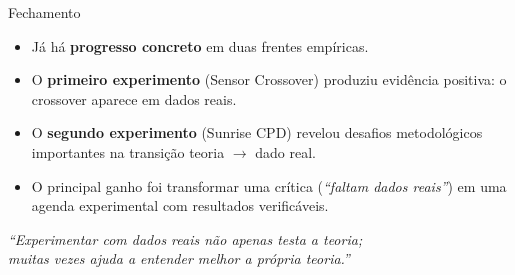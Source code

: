 \documentclass[aspectratio=169, 11pt]{beamer}
\begin{document}
\begin{frame}{Fechamento}

\begin{itemize}
  \item Já há \textbf{progresso concreto} em duas frentes empíricas.
  \item O \textbf{primeiro experimento} (Sensor Crossover) produziu
        evidência positiva: o crossover aparece em dados reais.
  \item O \textbf{segundo experimento} (Sunrise CPD) revelou desafios
        metodológicos importantes na transição teoria $\to$ dado real.
  \item O principal ganho foi transformar uma crítica
        (\textit{``faltam dados reais''}) em uma agenda experimental
        com resultados verificáveis.
\end{itemize}

\vspace{1.0em}
\begin{center}
\begin{minipage}{0.88\textwidth}
\centering\itshape
\textcolor{accent}{\large
``Experimentar com dados reais não apenas testa a teoria;\\
muitas vezes ajuda a entender melhor a própria teoria.''}
\end{minipage}
\end{center}

\end{frame}
\end{document}
